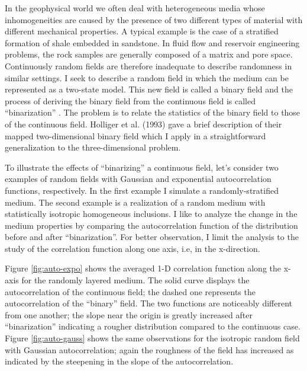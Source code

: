  In the geophysical world we often deal with heterogeneous media 
whose inhomogeneities are caused by the presence of two different 
types of material
with different mechanical properties. A typical example is the case of a
stratified formation of shale embedded in sandstone. In fluid flow and 
reservoir engineering problems, the rock samples are generally composed of 
a matrix and pore space. Continuously random fields are therefore
inadequate to describe randomness in similar settings. I seek to describe 
a random field in which the medium can be represented as a two-state model. 
This new field is called a binary field and the 
process of deriving the binary field from the continuous field is called 
``binarization'' \cite[]{Holliger2}. The problem is to relate the statistics
of the binary field to those of the continuous field. 
Holliger et al. (1993) gave a brief description of their mapped two-dimensional binary field which I 
apply in a straightforward generalization to the three-dimensional problem.\
\par
To illustrate the effects of ``binarizing'' a continuous field, let's consider two
examples of random fields with Gaussian and exponential autocorrelation 
functions, respectively. In the first example I simulate a randomly-stratified medium. The
second example is a realization of a random medium with statistically 
isotropic homogeneous inclusions. I like to analyze the change in the medium
properties by comparing the autocorrelation function of the distribution
before and after ``binarization''. For better observation, I limit the analysis 
to the study of the correlation function along one axis, 
i.e, in the x-direction.
\par
Figure \ref{fig:auto-expo} shows the averaged 1-D correlation 
function along the x-axis 
for the randomly layered medium. The solid curve displays the autocorrelation
of the continuous field; the dashed one represents the autocorrelation
of the ``binary'' field. The two functions are noticeably different from one 
another; the slope near the origin is greatly increased after ``binarization''
indicating
a rougher distribution compared to the continuous case. Figure \ref{fig:auto-gauss} shows
the same observations for the isotropic random field with Gaussian 
autocorrelation; again the roughness
of the field has increased as indicated by the steepening in the slope of the
autocorrelation.

